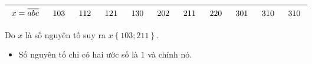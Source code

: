 \begin{vd}
{\begin{center}
\begin{tabular}{|c|c|c|c|c|c|c|c|c|c|c|}
		\hline
		${\hskip 0.1 cm}x = \overline{abc}{\hskip 0.1 cm}$& ${\hskip 0.1 cm}103{\hskip 0.1 cm}$ & ${\hskip 0.1 cm}112{\hskip 0.1 cm}$ & ${\hskip 0.1 cm}121{\hskip 0.1 cm}$ &${\hskip 0.1 cm}130{\hskip 0.1 cm}$& ${\hskip 0.1 cm}202{\hskip 0.1 cm}$& ${\hskip 0.1 cm}211{\hskip 0.1 cm}$& ${\hskip 0.1 cm}220{\hskip 0.1 cm}$& ${\hskip 0.1 cm}301{\hskip 0.1 cm}$& ${\hskip 0.1 cm}310{\hskip 0.1 cm}$& ${\hskip 0.1 cm}310{\hskip 0.1 cm}$\\
		\hline
	\end{tabular}
\end{center}
Do $x$ là số nguyên tố suy ra $x\left\{103; 211\right\}$.		
	}
\end{vd}
\begin{note} 
	\begin{itemize}
		\item Số nguyên tố chỉ có hai ước số là $1$ và chính nó. 
	\end{itemize}
\end{note}
